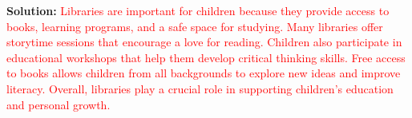 \documentclass[12pt]{article}
\begin{document}
\begin{tcolorbox}[colframe=black!50, colback=white, title=Question 10: Writing Performance Task]
\textbf{Solution:} \textcolor{red}{Libraries are important for children because they provide access to books, learning programs, and a safe space for studying. Many libraries offer storytime sessions that encourage a love for reading. Children also participate in educational workshops that help them develop critical thinking skills. Free access to books allows children from all backgrounds to explore new ideas and improve literacy. Overall, libraries play a crucial role in supporting children's education and personal growth.}
\end{tcolorbox}
\end{document}
